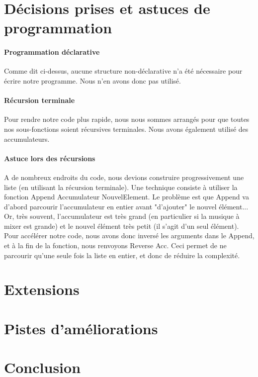 \documentclass[12pt,a4paper]{article}
\begin{document}
\section{Décisions prises et astuces de programmation}

\paragraph{Programmation déclarative} Comme dit ci-dessus, aucune structure non-déclarative n'a été nécessaire pour écrire notre programme. Nous n'en avons donc pas utilisé.

\paragraph{Récursion terminale}
Pour rendre notre code plus rapide, nous nous sommes arrangés pour que toutes nos sous-fonctions soient récursives terminales. Nous avons également utilisé des accumulateurs.
\paragraph{Astuce lors des récursions}
A de nombreux endroits du code, nous devions construire progressivement une liste (en utilisant la récursion terminale). Une technique consiste à utiliser la fonction {Append Accumulateur NouvelElement}. Le problème est que Append va d'abord parcourir l'accumulateur en entier avant "d'ajouter" le nouvel élément... Or, très souvent, l'accumulateur est très grand (en particulier si la musique à mixer est grande) et le nouvel élément très petit (il s'agit d'un seul élément). Pour accélérer notre code, nous avons donc inversé les arguments dans le Append, et à la fin de la fonction, nous renvoyons {Reverse Acc}. Ceci permet de ne parcourir qu'une seule fois la liste en entier, et donc de réduire la complexité.


\section{Extensions}
\section{Pistes d'améliorations}
\section{Conclusion}
\end{document}
